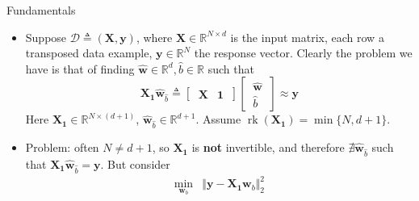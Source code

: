 \documentclass{beamer}
\numberwithin{equation}{section}
\begin{document}
\begin{frame}{Fundamentals}
    \begin{itemize}
        \item
        Suppose $ \mathcal{D} \triangleq (\mathbf{X}, \mathbf{y}) $, where
        $ \mathbf{X} \in \mathbb{R}^{N \times d} $ is the input matrix, each
        row a transposed data example, $ \mathbf{y} \in \mathbb{R}^N $ the
        response vector. Clearly the problem we have is that of finding
        $ \hat{\mathbf{w}} \in \mathbb{R}^d , \hat{b} \in \mathbb{R} $
        such that
        \begin{equation*}
            \mathbf{X}_\mathbf{1}\hat{\mathbf{w}}_{\hat{b}} \triangleq
            \begin{bmatrix}
                \ \mathbf{X} & \mathbf{1} \
            \end{bmatrix}
            \begin{bmatrix}
                \ \hat{\mathbf{w}} \ \\ \ \hat{b} \
            \end{bmatrix} \approx \mathbf{y}
        \end{equation*}
        Here $ \mathbf{X}_\mathbf{1} \in \mathbb{R}^{N \times (d + 1)} $,
        $ \hat{\mathbf{w}}_{\hat{b}} \in \mathbb{R}^{d + 1} $. Assume
        $ \operatorname{rk}(\mathbf{X}_\mathbf{1}) = \min\{N, d + 1\} $.

        \item
        Problem: often $ N \ne d + 1 $, so $ \mathbf{X}_\mathbf{1} $ is
        \textbf{not} invertible, and therefore $ \nexists
        \hat{\mathbf{w}}_{\hat{b}} $ such that $ \mathbf{X}_\mathbf{1}
        \hat{\mathbf{w}}_{\hat{b}} = \mathbf{y} $. But consider
        \begin{equation} \label{lr_2norm_aug}
            \begin{array}{ll}
                \displaystyle\min_{\mathbf{w}_b} &
                \Vert\mathbf{y} - \mathbf{X}_\mathbf{1}\mathbf{w}_b\Vert_2^2
            \end{array}
        \end{equation}
    \end{itemize}
\end{frame}
\end{document}
